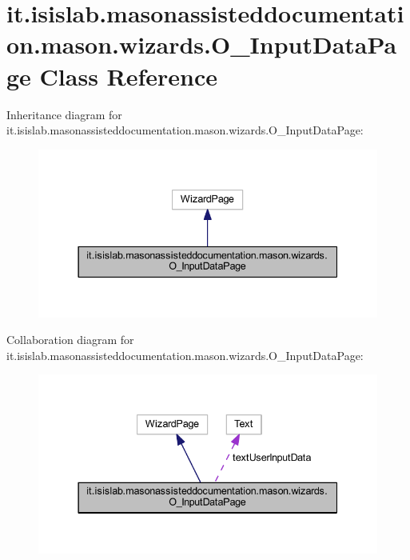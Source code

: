 \hypertarget{classit_1_1isislab_1_1masonassisteddocumentation_1_1mason_1_1wizards_1_1_o___input_data_page}{\section{it.\-isislab.\-masonassisteddocumentation.\-mason.\-wizards.\-O\-\_\-\-Input\-Data\-Page Class Reference}
\label{classit_1_1isislab_1_1masonassisteddocumentation_1_1mason_1_1wizards_1_1_o___input_data_page}
}


Inheritance diagram for it.\-isislab.\-masonassisteddocumentation.\-mason.\-wizards.\-O\-\_\-\-Input\-Data\-Page\-:
\nopagebreak
\begin{figure}[H]
\begin{center}
\leavevmode
\includegraphics[width=337pt]{classit_1_1isislab_1_1masonassisteddocumentation_1_1mason_1_1wizards_1_1_o___input_data_page__inherit__graph}
\end{center}
\end{figure}


Collaboration diagram for it.\-isislab.\-masonassisteddocumentation.\-mason.\-wizards.\-O\-\_\-\-Input\-Data\-Page\-:
\nopagebreak
\begin{figure}[H]
\begin{center}
\leavevmode
\includegraphics[width=337pt]{classit_1_1isislab_1_1masonassisteddocumentation_1_1mason_1_1wizards_1_1_o___input_data_page__coll__graph}
\end{center}
\end{figure}
